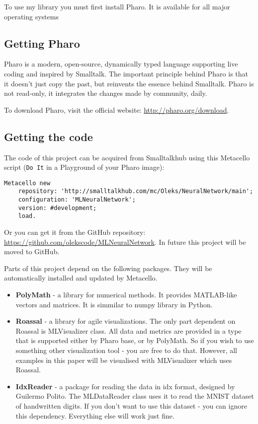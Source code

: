 To use my library you must first install Pharo. It is available for all major operating systems

\subsection{Getting Pharo}
Pharo is a modern, open-source, dynamically typed language supporting live coding and inspired by Smalltalk. The important principle behind Pharo is that it doesn’t just copy the past, but reinvents the essence behind Smalltalk. Pharo is not read-only, it integrates the changes made by community, daily\cite{PBE2}.

To download Pharo, visit the official website: \url{http://pharo.org/download}.

\subsection{Getting the code}
The code of this project can be acquired from Smalltalkhub using this Metacello script (\texttt{Do It} in a Playground of your Pharo image):

\begin{lstlisting}
Metacello new 
    repository: 'http://smalltalkhub.com/mc/Oleks/NeuralNetwork/main';
    configuration: 'MLNeuralNetwork';
    version: #development;
    load.
\end{lstlisting}

Or you can get it from the GitHub repository: \url{https://github.com/olekscode/MLNeuralNetwork}. In future this project will be moved to GitHub.

Parts of this project depend on the following packages. They will be automatically installed and updated by Metacello.
\begin{itemize}
  \item \textbf{PolyMath} - a library for numerical methods. It provides MATLAB-like vectors and matrices. It is simmilar to numpy library in Python.
  \item \textbf{Roassal} - a library for agile visualizations. The only part dependent on Roassal is MLVisualizer class. All data and metrics are provided in a type that is supported either by Pharo base, or by PolyMath. So if you wish to use something other visualization tool - you are free to do that. However, all examples in this paper will be visualised with MLVisualizer which uses Roassal.
  \item \textbf{IdxReader} - a package for reading the data in idx format, designed by Guilermo Polito. The MLDataReader class uses it to read the MNIST dataset of handwritten digits. If you don't want to use this dataset - you can ignore this dependency. Everything else will work just fine.
\end{itemize}

